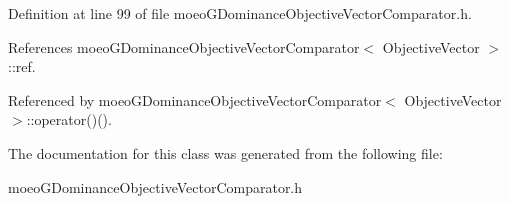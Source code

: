 Definition at line 99 of file moeo\-GDominance\-Objective\-Vector\-Comparator.h.

References moeo\-GDominance\-Objective\-Vector\-Comparator$<$ Objective\-Vector $>$::ref.

Referenced by moeo\-GDominance\-Objective\-Vector\-Comparator$<$ Objective\-Vector $>$::operator()().

The documentation for this class was generated from the following file:\begin{CompactItemize}
\item 
moeo\-GDominance\-Objective\-Vector\-Comparator.h\end{CompactItemize}
